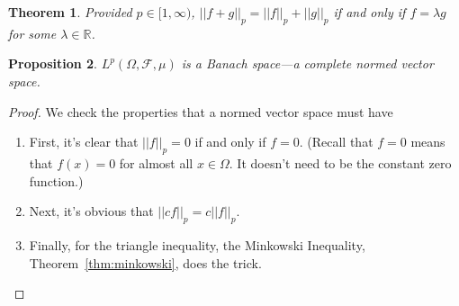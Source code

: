 \documentclass[12pt]{article}
\theoremstyle{plain}
\newtheorem{thm}{Theorem}[section]
\newtheorem{prop}[thm]{Proposition}
\theoremstyle{definition}
\theoremstyle{remark}
\newcommand{\sF}{\mathscr{F}}
\begin{document}


\begin{thm}
Provided $p\in[1,\infty)$, $|| f+g||_p=|| f||_p+|| g||_p$ if and only if
$f=\lambda g$ for some $\lambda\in \mathbb{R}$.
\end{thm}

\begin{prop}
$L^p(\Omega,\sF,\mu)$ is a Banach space---a complete normed vector
space.
\end{prop}
\begin{proof}
We check the properties that a normed vector space must have
\begin{enumerate}
  \item First, it's clear that $|| f||_p=0$ if and only if
    $f=0$. (Recall that $f=0$ means that $f(x)=0$ for almost all
    $x\in\Omega$. It doesn't need to be the constant zero function.)
  \item Next, it's obvious that $|| cf||_p = c|| f||_p$.
  \item Finally, for the triangle inequality, the Minkowski Inequality,
    Theorem~\ref{thm:minkowski}, does the trick.
\end{enumerate}
\end{proof}
\end{document}

